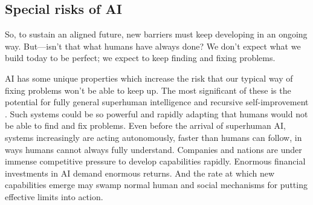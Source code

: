 \documentclass[11pt]{article}
\begin{document}









\subsection*{Special risks of AI}

So, to sustain an aligned future, new barriers must keep developing in an ongoing way. But---isn't that what humans have always done? We don't expect what we build today to be perfect; we expect to keep finding and fixing problems. 

AI has some unique properties which increase the risk that our typical way of fixing problems won't be able to keep up. The most significant of these is the potential for fully general superhuman intelligence and recursive self-improvement \citep{bostrom2014superintelligence}. Such systems could be so powerful and rapidly adapting that humans would not be able to find and fix problems. Even before the arrival of superhuman AI, systems increasingly are acting autonomously, faster than humans can follow, in ways humans cannot always fully understand. Companies and nations are under immense competitive pressure to develop capabilities rapidly. Enormous financial investments in AI demand enormous returns. And the rate at which new capabilities emerge may swamp normal human and social mechanisms for putting effective limits into action. 
\end{document}
